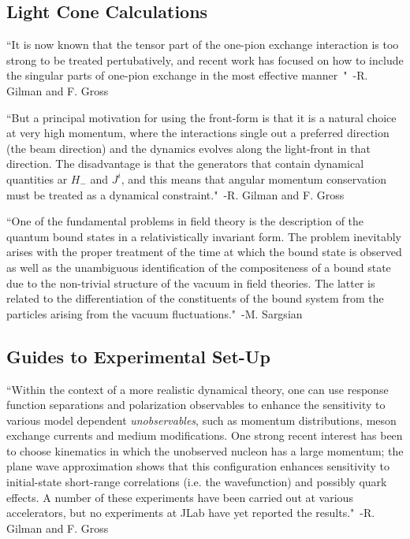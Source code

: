 \subsection{Light Cone Calculations}

``It is now known that the tensor part of the one-pion exchange interaction is too strong to be treated pertubatively, and recent work has focused on how to include the singular parts of one-pion exchange in the most effective manner~\cite{Phillips:1999hh,Phillips:1999am,Walzl:2001vb}"~-R. Gilman and F. Gross~\cite{Gilman:2001yh}

``But a principal motivation for using the front-form is that it is a natural choice at very high momentum, where the interactions single out a preferred direction (the beam direction) and the dynamics evolves along the light-front in that direction. The disadvantage is that the generators that contain dynamical quantities ar $H_{-}$ and $J^i$, and this means that angular momentum conservation must be treated as a dynamical constraint."~-R. Gilman and F. Gross~\cite{Gilman:2001yh}

``One of the fundamental problems in field theory is the description of the quantum bound states in a relativistically invariant form. The problem inevitably arises with the proper treatment of the time at which the bound state is observed as well as the unambiguous identification of the compositeness of a bound state due to the non-trivial structure of the vacuum in field theories. The latter is related to the differentiation of the constituents of the bound system from the particles arising from the vacuum fluctuations."~-M. Sargsian~\cite{Sargsian:2014bwa}




\subsection{Guides to Experimental Set-Up}

``Within the context of a more realistic dynamical theory, one can use response function separations and polarization observables to enhance the sensitivity to various model dependent \emph{unobservables}, such as momentum distributions, meson exchange currents and medium modifications. One strong recent interest has been to choose kinematics in which the unobserved nucleon has a large momentum; the plane wave approximation shows that this configuration enhances sensitivity to initial-state short-range correlations (i.e. the wavefunction) and possibly quark effects. A number of these experiments have been carried out at various accelerators, but no experiments at JLab have yet reported the results."~-R. Gilman and F. Gross~\cite{Gilman:2001yh}

